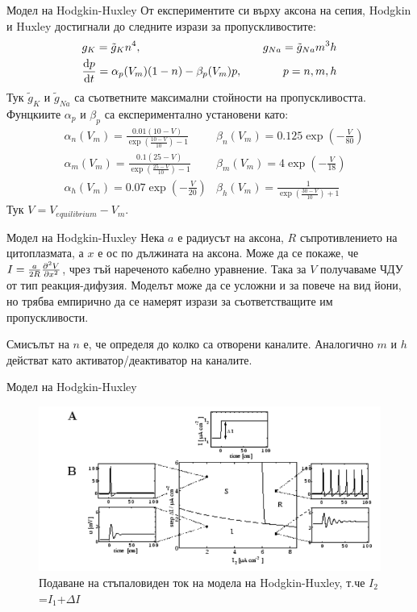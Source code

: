 \begin{frame}[t]{Модел на Hodgkin-Huxley}
  От експериментите си върху аксона на сепия, Hodgkin и Huxley достигнали до следните изрази за пропускливостите:
  \begin{align*}
    &g_{K}=\tilde{g}_{K}n^4,\quad &g_{Na}=\tilde{g}_{Na}m^3h \\
    &\dv{p}{t}=\alpha_p(V_m)(1-n)-\beta_p(V_m)p,\quad &p={n,m,h}
  \end{align*}
  Тук $\tilde{g}_{K}$ и $\tilde{g}_{Na}$ са съответните максимални стойности на пропускливостта.
  Фунцкиите $\alpha_p$ и $\beta_p$ са експериментално установени като: 
  \begin{align*}
    &\alpha_{n}(V_{m})={\frac{0.01(10-V)}{\exp\left({\frac{10-V}{10}}\right)-1}} &\beta_{n}(V_{m})=0.125\exp\left(-\frac{V}{80}\right)\\
    &\alpha_{m}(V_{m})={\frac{0.1(25-V)}{\exp\left({\frac{25-V}{10}}\right)-1}} &\beta_{m}(V_{m})=4\exp\left(-\frac{V}{18}\right)\\
    &\alpha_{h}(V_{m})=0.07\exp\left(-{\frac{V}{20}}\right) &\beta_{h}(V_{m})={\frac{1}{\exp\left({\frac{30-V}{10}}\right)+1}}  
  \end{align*}
  Тук $V = V_{equilibrium} - V_m$.
\end{frame}

\begin{frame}[t]{Модел на Hodgkin-Huxley}
  Нека $a$ е радиусът на аксона, $R$ съпротивлението на цитоплазмата, а $x$ е ос по дължината на аксона.
  Може да се покаже, че $I={\frac{a}{2R}}\pdv[2]{V}{x}$, чрез тъй нареченото кабелно уравнение.
  Така за $V$ получаваме ЧДУ от тип реакция-дифузия.
  Моделът може да се усложни и за повече на вид йони, но трябва емпирично да се намерят изрази за съответстващите им пропускливости.

  Смисълът на $n$ е, че определя до колко са отворени  каналите.
  Аналогично $m$ и $h$ действат като активатор/деактиватор на  каналите.
\end{frame}

\begin{frame}[t]{Модел на Hodgkin-Huxley}
  \begin{figure}[htbp!]
      \centering
      \includegraphics[width=\textwidth,height=0.7\textheight,keepaspectratio]{hodgkin-huxley-response.PNG}
      \caption{Подаване на стъпаловиден ток на модела на Hodgkin-Huxley, т.че $I_2$=$I_1$+$\Delta I$ \cite[Фиг 2.6]{Spiking}}
  \end{figure}
\end{frame}

